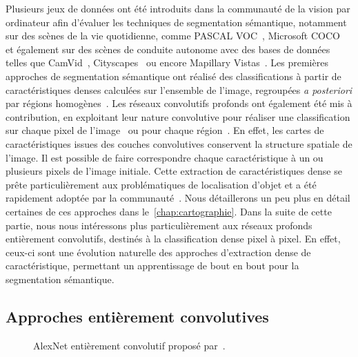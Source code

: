 Plusieurs jeux de données ont été introduits dans la communauté de la vision par ordinateur afin d'évaluer les techniques de segmentation sémantique, notamment sur des scènes de la vie quotidienne, comme PASCAL VOC~\cite{everingham_pascal_2014}, Microsoft COCO~\cite{lin_microsoft_2014} et également sur des scènes de conduite autonome avec des bases de données telles que CamVid~\cite{brostow_semantic_2009}, Cityscapes~\cite{cordts_cityscapes_2016} ou encore Mapillary Vistas~\cite{neuhold_mapillary_2017}. Les premières approches de segmentation sémantique ont réalisé des classifications à partir de caractéristiques denses calculées sur l'ensemble de l'image, regroupées \emph{a posteriori} par régions homogènes~\cite{shotton_semantic_2008,shotton_real-time_2011}. Les réseaux convolutifs profonds ont également été mis à contribution, en exploitant leur nature convolutive pour réaliser une classification sur chaque pixel de l'image~\cite{grangier_deep_2009,ciresan_deep_2012} ou pour chaque région~\cite{farabet_towards_2013,sermanet_overfeat_2013}. En effet, les cartes de caractéristiques issues des couches convolutives conservent la structure spatiale de l'image. Il est possible de faire correspondre chaque caractéristique à un ou plusieurs pixels de l'image initiale. Cette extraction de caractéristiques dense se prête particulièrement aux problématiques de localisation d'objet et a été rapidement adoptée par la communauté~\cite{zou_generic_2014}. Nous détaillerons un peu plus en détail certaines de ces approches dans le~\cref{chap:cartographie}. Dans la suite de cette partie, nous nous intéressons plus particulièrement aux réseaux profonds entièrement convolutifs, destinés à la classification dense pixel à pixel. En effet, ceux-ci sont une évolution naturelle des approches d'extraction dense de caractéristique, permettant un apprentissage de bout en bout pour la segmentation sémantique.

\subsection{Approches entièrement convolutives}

\begin{figure}
  \resizebox{\textwidth}{!}{%
  
  }
  \caption[AlexNet entièrement convolutif.]{AlexNet entièrement convolutif proposé par~\citet{long_fully_2015}.}
\end{figure}


